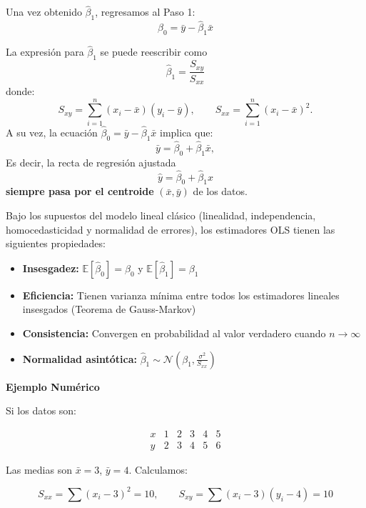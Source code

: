 \documentclass[12pt, a4paper]{article}
\begin{document}
Una vez obtenido $\hat{\beta}_1$, regresamos al Paso 1:
\[
\boxed{\hat{\beta}_0 = \bar{y} - \hat{\beta}_1 \bar{x}}
\]

\begin{observacion}{}{}
 
La expresión para $\hat{\beta}_1$ se puede reescribir como
\[
\boxed{\hat{\beta}_1 = \frac{S_{xy}}{S_{xx}}}
\]
donde:
\[
S_{xy} = \sum_{i=1}^n (x_i - \bar{x})(y_i - \bar{y}), \qquad
S_{xx} = \sum_{i=1}^n (x_i - \bar{x})^2.
\]
A su vez, la ecuación $\hat{\beta}_0 = \bar{y} - \hat{\beta}_1 \bar{x}$ implica que:
\[
\bar{y} = \hat{\beta}_0 + \hat{\beta}_1 \bar{x},
\]
Es decir, la recta de regresión ajustada
\[
\hat{y} = \hat{\beta}_0 + \hat{\beta}_1 x
\]
\textbf{siempre pasa por el centroide} $(\bar{x}, \bar{y})$ de los datos.
\end{observacion}


\begin{observacion}{}{}

Bajo los supuestos del modelo lineal clásico (linealidad, independencia, homocedasticidad y normalidad de errores), los estimadores OLS tienen las siguientes propiedades:

\begin{itemize}
\item \textbf{Insesgadez:} $\mathbb{E}[\hat{\beta}_0] = \beta_0$ y $\mathbb{E}[\hat{\beta}_1] = \beta_1$
\item \textbf{Eficiencia:} Tienen varianza mínima entre todos los estimadores lineales insesgados (Teorema de Gauss-Markov)
\item \textbf{Consistencia:} Convergen en probabilidad al valor verdadero cuando $n \to \infty$
\item \textbf{Normalidad asintótica:} $\hat{\beta}_1 \sim \mathcal{N}\left(\beta_1, \frac{\sigma^2}{S_{xx}}\right)$
\end{itemize}
\end{observacion}

\textbf{Ejemplo Numérico}

Si los datos son:

\[
\begin{array}{c|ccccc}
x & 1 & 2 & 3 & 4 & 5 \\
\hline
y & 2 & 3 & 4 & 5 & 6
\end{array}
\]

Las medias son $\bar{x} = 3$, $\bar{y} = 4$. Calculamos:

\[
S_{xx} = \sum (x_i - 3)^2 = 10, \qquad S_{xy} = \sum (x_i - 3)(y_i - 4) = 10
\]
\end{document}
